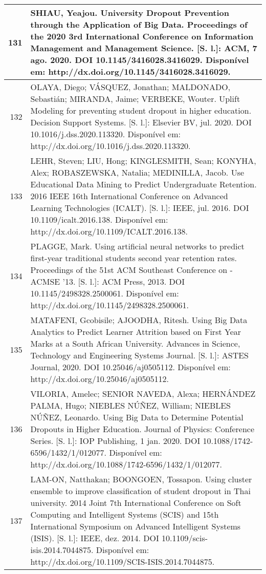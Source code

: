 \begin{apendicesenv}
\begin{longtable}[c]{|r|l|}
131 &
  \multicolumn{1}{p{14.5cm}|}{SHIAU, Yeajou. University Dropout Prevention through the Application of Big Data. Proceedings of the 2020 3rd International Conference on Information Management and Management Science. {[}S. l.{]}: ACM, 7 ago. 2020. DOI 10.1145/3416028.3416029. Disponível em: http://dx.doi.org/10.1145/3416028.3416029.} \\ \hline
132 &
  \multicolumn{1}{p{14.5cm}|}{OLAYA, Diego; VÁSQUEZ, Jonathan; MALDONADO, Sebastián; MIRANDA, Jaime; VERBEKE, Wouter. Uplift Modeling for preventing student dropout in higher education. Decision Support Systems. {[}S. l.{]}: Elsevier BV, jul. 2020. DOI 10.1016/j.dss.2020.113320. Disponível em: http://dx.doi.org/10.1016/j.dss.2020.113320.} \\ \hline
133 &
  \multicolumn{1}{p{14.5cm}|}{LEHR, Steven; LIU, Hong; KINGLESMITH, Sean; KONYHA, Alex; ROBASZEWSKA, Natalia; MEDINILLA, Jacob. Use Educational Data Mining to Predict Undergraduate Retention. 2016 IEEE 16th International Conference on Advanced Learning Technologies (ICALT). {[}S. l.{]}: IEEE, jul. 2016. DOI 10.1109/icalt.2016.138. Disponível em: http://dx.doi.org/10.1109/ICALT.2016.138.} \\ \hline
134 &
  \multicolumn{1}{p{14.5cm}|}{PLAGGE, Mark. Using artificial neural networks to predict first-year traditional students second year retention rates. Proceedings of the 51st ACM Southeast Conference on - ACMSE ’13. {[}S. l.{]}: ACM Press, 2013. DOI 10.1145/2498328.2500061. Disponível em: http://dx.doi.org/10.1145/2498328.2500061.} \\ \hline
135 &
  \multicolumn{1}{p{14.5cm}|}{MATAFENI, Gcobisile; AJOODHA, Ritesh. Using Big Data Analytics to Predict Learner Attrition based on First Year Marks at a South African University. Advances in Science, Technology and Engineering Systems Journal. {[}S. l.{]}: ASTES Journal, 2020. DOI 10.25046/aj0505112. Disponível em: http://dx.doi.org/10.25046/aj0505112.} \\ \hline
136 &
  \multicolumn{1}{p{14.5cm}|}{VILORIA, Amelec; SENIOR NAVEDA, Alexa; HERNÁNDEZ PALMA, Hugo; NIEBLES NÚÑEZ, William; NIEBLES NÚÑEZ, Leonardo. Using Big Data to Determine Potential Dropouts in Higher Education. Journal of Physics: Conference Series. {[}S. l.{]}: IOP Publishing, 1 jan. 2020. DOI 10.1088/1742-6596/1432/1/012077. Disponível em: http://dx.doi.org/10.1088/1742-6596/1432/1/012077.} \\ \hline
137 &
  \multicolumn{1}{p{14.5cm}|}{LAM-ON, Natthakan; BOONGOEN, Tossapon. Using cluster ensemble to improve classification of student dropout in Thai university. 2014 Joint 7th International Conference on Soft Computing and Intelligent Systems (SCIS) and 15th International Symposium on Advanced Intelligent Systems (ISIS). {[}S. l.{]}: IEEE, dez. 2014. DOI 10.1109/scis-isis.2014.7044875. Disponível em: http://dx.doi.org/10.1109/SCIS-ISIS.2014.7044875.} \\ \hline

\end{longtable}
\end{apendicesenv}
